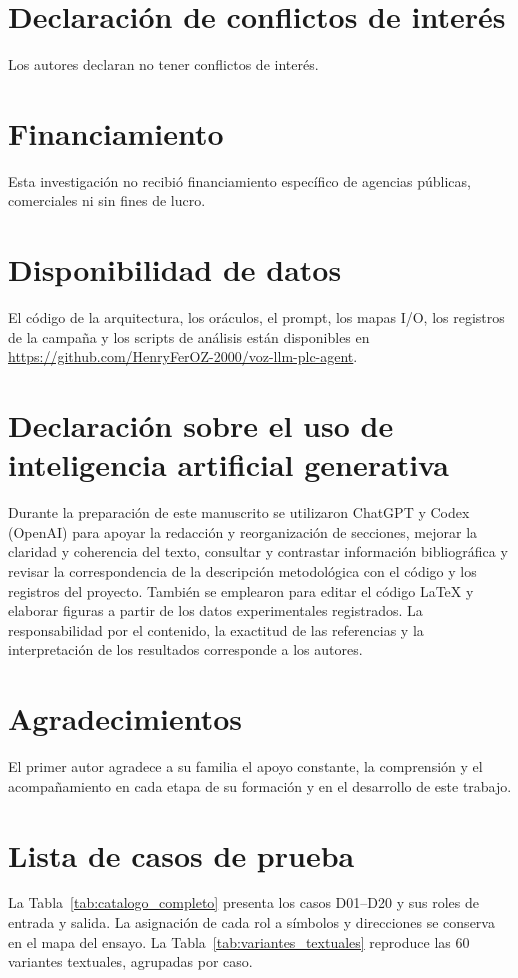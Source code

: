 \documentclass[a4paper,fleqn]{cas-dc}
\begin{document}
\section*{Declaración de conflictos de interés}
Los autores declaran no tener conflictos de interés.
\section*{Financiamiento}
Esta investigación no recibió financiamiento específico de agencias públicas, comerciales ni sin fines de lucro.

\section*{Disponibilidad de datos}
El código de la arquitectura, los oráculos, el prompt, los mapas I/O, los registros de la campaña y los scripts de análisis están disponibles en \url{https://github.com/HenryFerOZ-2000/voz-llm-plc-agent}.

\section*{Declaración sobre el uso de inteligencia artificial generativa}
Durante la preparación de este manuscrito se utilizaron ChatGPT y Codex (OpenAI) para apoyar la redacción y reorganización de secciones, mejorar la claridad y coherencia del texto, consultar y contrastar información bibliográfica y revisar la correspondencia de la descripción metodológica con el código y los registros del proyecto. También se emplearon para editar el código LaTeX y elaborar figuras a partir de los datos experimentales registrados. La responsabilidad por el contenido, la exactitud de las referencias y la interpretación de los resultados corresponde a los autores.
\section*{Agradecimientos}
El primer autor agradece a su familia el apoyo constante, la comprensión y el acompañamiento en cada etapa de su formación y en el desarrollo de este trabajo.



\FloatBarrier



\appendix
\section{Lista de casos de prueba}
\label{app:casos}
La Tabla~\ref{tab:catalogo_completo} presenta los casos D01--D20 y sus roles de entrada y salida. La asignación de cada rol a símbolos y direcciones se conserva en el mapa del ensayo. La Tabla~\ref{tab:variantes_textuales} reproduce las 60 variantes textuales, agrupadas por caso.
\end{document}
